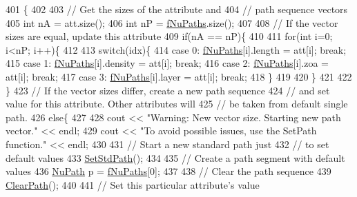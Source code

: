 \begin{DoxyCode}
401                                                     \{
402 
403   \textcolor{comment}{// Get the sizes of the attribute and}
404   \textcolor{comment}{// path sequence vectors}
405   \textcolor{keywordtype}{int} nA = att.size();
406   \textcolor{keywordtype}{int} nP = \hyperlink{classOscProb_1_1PMNS__Base_a69db9d57e12fc7cbe0431bc6c18fac93}{fNuPaths}.size();
407 
408   \textcolor{comment}{// If the vector sizes are equal, update this attribute}
409   \textcolor{keywordflow}{if}(nA == nP)\{
410 
411     \textcolor{keywordflow}{for}(\textcolor{keywordtype}{int} i=0; i<nP; i++)\{
412 
413       \textcolor{keywordflow}{switch}(idx)\{
414         \textcolor{keywordflow}{case} 0: \hyperlink{classOscProb_1_1PMNS__Base_a69db9d57e12fc7cbe0431bc6c18fac93}{fNuPaths}[i].length  = att[i]; \textcolor{keywordflow}{break};
415         \textcolor{keywordflow}{case} 1: \hyperlink{classOscProb_1_1PMNS__Base_a69db9d57e12fc7cbe0431bc6c18fac93}{fNuPaths}[i].density = att[i]; \textcolor{keywordflow}{break};
416         \textcolor{keywordflow}{case} 2: \hyperlink{classOscProb_1_1PMNS__Base_a69db9d57e12fc7cbe0431bc6c18fac93}{fNuPaths}[i].zoa     = att[i]; \textcolor{keywordflow}{break};
417         \textcolor{keywordflow}{case} 3: \hyperlink{classOscProb_1_1PMNS__Base_a69db9d57e12fc7cbe0431bc6c18fac93}{fNuPaths}[i].layer   = att[i]; \textcolor{keywordflow}{break};
418       \}
419 
420     \}
421 
422   \}
423   \textcolor{comment}{// If the vector sizes differ, create a new path sequence}
424   \textcolor{comment}{// and set value for this attribute. Other attributes will}
425   \textcolor{comment}{// be taken from default single path.}
426   \textcolor{keywordflow}{else}\{
427 
428     cout << \textcolor{stringliteral}{"Warning: New vector size. Starting new path vector."} << endl;
429     cout << \textcolor{stringliteral}{"To avoid possible issues, use the SetPath function."} << endl;
430 
431     \textcolor{comment}{// Start a new standard path just}
432     \textcolor{comment}{// to set default values}
433     \hyperlink{classOscProb_1_1PMNS__Base_add6533a9fc9acdfc7ae258b62570d78d}{SetStdPath}();
434 
435     \textcolor{comment}{// Create a path segment with default values}
436     \hyperlink{structOscProb_1_1NuPath}{NuPath} p = \hyperlink{classOscProb_1_1PMNS__Base_a69db9d57e12fc7cbe0431bc6c18fac93}{fNuPaths}[0];
437 
438     \textcolor{comment}{// Clear the path sequence}
439     \hyperlink{classOscProb_1_1PMNS__Base_aefe521239031c418cfaaaa550a6e13bb}{ClearPath}();
440 
441     \textcolor{comment}{// Set this particular attribute's value}

\end{DoxyCode}
